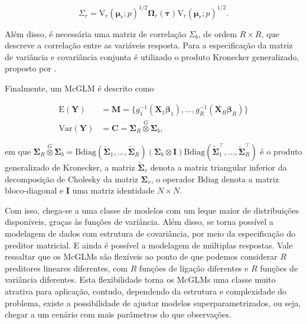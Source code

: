 \begin{equation}
\Sigma_r =
\mathrm{V}_r\left(\boldsymbol{\mu}_r; p\right)^{1/2}\boldsymbol{\Omega}_r\left(\boldsymbol{\tau}\right)\mathrm{V}_r\left(\boldsymbol{\mu}_r; p\right)^{1/2}.
\end{equation}

Além disso, é necessária uma matriz de correlação $\Sigma_b$, de ordem $R \times R$, que descreve a correlação entre as variáveis resposta. Para a especificação da matriz de variância e covariância conjunta é utilizado o produto Kronecker generalizado, proposto por \citet{martinez13}.

Finalmente, um McGLM é descrito como

\begin{equation}
\label{eq:mcglm}
      \begin{aligned}
        \mathrm{E}(\boldsymbol{Y}) &=
          \boldsymbol{M} =
            \{g_1^{-1}(\boldsymbol{X}_1 \boldsymbol{\beta}_1),
            \ldots,
            g_R^{-1}(\boldsymbol{X}_R \boldsymbol{\beta}_R)\}
          \\
        \mathrm{Var}(\boldsymbol{Y}) &=
          \boldsymbol{C} =
            \boldsymbol{\Sigma}_R \overset{G} \otimes
            \boldsymbol{\Sigma}_b,
      \end{aligned}
\end{equation}

\noindent em que $\boldsymbol{\Sigma}_R \overset{G} \otimes \boldsymbol{\Sigma}_b = \mathrm{Bdiag}(\tilde{\boldsymbol{\Sigma}}_1, \ldots, \tilde{\boldsymbol{\Sigma}}_R) (\boldsymbol{\Sigma}_b \otimes \boldsymbol{I}) \mathrm{Bdiag}(\tilde{\boldsymbol{\Sigma}}_1^\top, \ldots, \tilde{\boldsymbol{\Sigma}}_R^\top)$ é o produto generalizado de Kronecker, a matriz $\tilde{\boldsymbol{\Sigma}}_r$ denota a matriz triangular inferior da decomposição de Cholesky da matriz ${\boldsymbol{\Sigma}}_r$, o operador $\mathrm{Bdiag}$ denota a matriz bloco-diagonal e $\boldsymbol{I}$ uma matriz identidade $N \times N$. 

Com isso, chega-se a uma classe de modelos com um leque maior de distribuições disponíveis, graças às funções de variância. Além disso, se torna possível a modelagem de dados com estrutura de covariância, por meio da especificação do preditor matricial. E ainda é possível a modelagem de múltiplas respostas. Vale ressaltar que os McGLMs são flexíveis ao ponto de que podemos considerar $R$ preditores lineares diferentes, com $R$ funções de ligação diferentes e $R$ funções de variância diferentes. Esta flexibilidade torna os McGLMs uma classe muito atrativa para aplicação, contudo, dependendo da estrutura e complexidade do problema, existe a possibilidade de ajustar modelos superparametrizados, ou seja, chegar a um cenário com mais parâmetros do que observações. 

